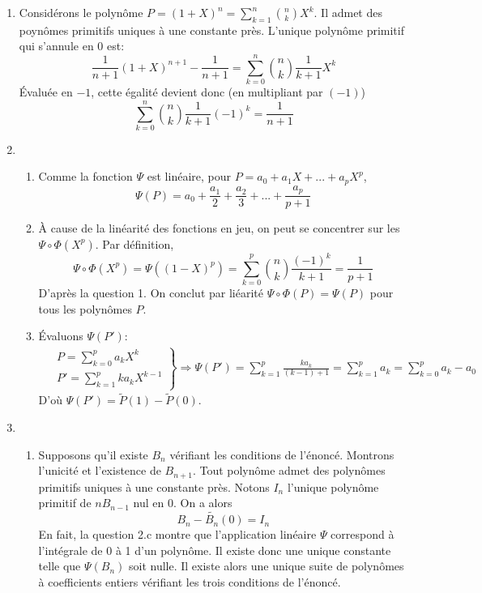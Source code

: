 \begin{enumerate}
\item Considérons le polynôme $P=(1+X)^n=\sum_{k=1}^{n}\binom{n}{k}X^k$. Il admet des poynômes primitifs uniques à une constante près. L'unique polynôme primitif qui s'annule en $0$ est:
	\[\frac{1}{n+1}(1+X)^{n+1}-\frac{1}{n+1} = \sum_{k=0}^{n}\binom{n}{k}\frac{1}{k+1}X^k\]
\'Evaluée en $-1$, cette égalité devient donc (en multipliant par $(-1)$)
	\[\sum_{k=0}^{n}\binom{n}{k}\frac{1}{k+1}(-1)^k=\frac{1}{n+1}\]
	
\item 
\begin{enumerate}
 \item Comme la fonction $\Psi$ est linéaire, pour $P=a_0+a_1X+ ... + a_pX^p$, 
		\[\Psi(P)=a_0+\frac{a_1}{2}+\frac{a_2}{3}+...+\frac{a_p}{p+1}\]
		
\item \`A cause de la linéarité des fonctions en jeu, on peut se concentrer sur les $\Psi \circ \Phi(X^p)$. Par définition,
\begin{displaymath}
 \Psi \circ \Phi(X^p)= \Psi((1-X)^p) = \sum_{k=0}^{p} \binom{n}{k}\frac{(-1)^k}{k+1} = \frac{1}{p+1}
\end{displaymath}
D'après la question 1. On conclut par liéarité $\Psi \circ \Phi(P) = \Psi (P)$ pour tous les polynômes $P$.
		
\item \'Evaluons $\Psi(P')$:
\begin{multline*}
\left. 
\begin{aligned}
&P=\sum_{k=0}^{p}a_kX^k \\ &P' = \sum_{k=1}^{p}k a_kX^{k-1} 
\end{aligned}
\right\rbrace 
\Rightarrow 
\Psi(P')= \sum_{k=1}^{p}\frac{k a_k}{(k-1)+1}=\sum_{k=1}^{p}a_k=\sum_{k=0}^{p}a_k - a_0
\end{multline*}
D'où $\Psi(P')= \widetilde{P}(1)-\widetilde{P}(0)$.
\end{enumerate}
	
\item
\begin{enumerate}
 \item Supposons qu'il existe $B_n$ vérifiant les conditions de l'énoncé. Montrons l'unicité et l'existence de $B_{n+1}$.\newline
Tout polynôme admet des polynômes primitifs uniques à une constante près. Notons $I_n$ l'unique polynôme primitif de $nB_{n-1}$ nul en 0. On a alors
\[B_n-\widetilde{B_n}(0)=I_n\]
En fait, la question 2.c montre que l'application linéaire $\Psi$ correspond à l'intégrale de 0 à 1 d'un polynôme. Il existe donc une unique constante telle que $\Psi(B_n)$ soit nulle. Il existe alors une unique suite de polynômes à coefficients entiers vérifiant les trois conditions de l'énoncé.
		

\end{enumerate}
\end{enumerate}
